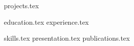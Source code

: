 \documentclass[11pt, a4paper]{awesome-cv}
\newcommand*{\sectiondir}{resume/}
\begin{document}
\makecvheader

{projects.tex}

{education.tex}
{experience.tex}
\newpage

{skills.tex}
{presentation.tex}
{publications.tex}
\end{document}
